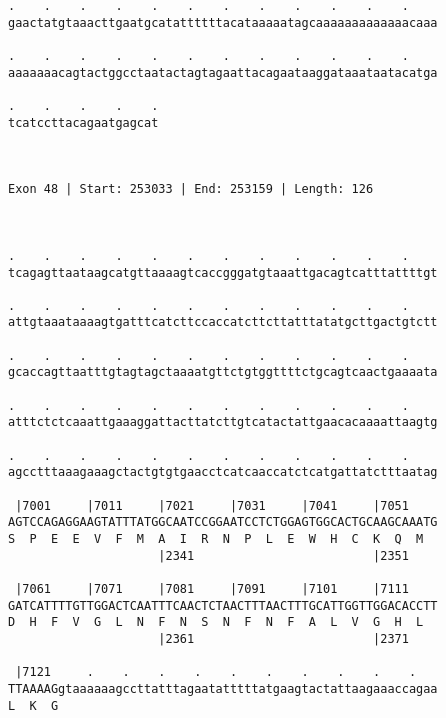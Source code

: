 \documentclass{article}
\begin{document}
\begin{Verbatim}
.    .    .    .    .    .    .    .    .    .    .    .    
gaactatgtaaacttgaatgcatattttttacataaaaatagcaaaaaaaaaaaaacaaa
                                                            
.    .    .    .    .    .    .    .    .    .    .    .    
aaaaaaacagtactggcctaatactagtagaattacagaataaggataaataatacatga
                                                            
.    .    .    .    .
tcatccttacagaatgagcat
                     
                     
 
Exon 48 | Start: 253033 | End: 253159 | Length: 126



.    .    .    .    .    .    .    .    .    .    .    .    
tcagagttaataagcatgttaaaagtcaccgggatgtaaattgacagtcatttattttgt
                                                            
.    .    .    .    .    .    .    .    .    .    .    .    
attgtaaataaaagtgatttcatcttccaccatcttcttatttatatgcttgactgtctt
                                                            
.    .    .    .    .    .    .    .    .    .    .    .    
gcaccagttaatttgtagtagctaaaatgttctgtggttttctgcagtcaactgaaaata
                                                            
.    .    .    .    .    .    .    .    .    .    .    .    
atttctctcaaattgaaaggattacttatcttgtcatactattgaacacaaaattaagtg
                                                            
.    .    .    .    .    .    .    .    .    .    .    .    
agcctttaaagaaagctactgtgtgaacctcatcaaccatctcatgattatctttaatag
                                                            
 |7001     |7011     |7021     |7031     |7041     |7051    
AGTCCAGAGGAAGTATTTATGGCAATCCGGAATCCTCTGGAGTGGCACTGCAAGCAAATG
S  P  E  E  V  F  M  A  I  R  N  P  L  E  W  H  C  K  Q  M  
                     |2341                         |2351    
  
 |7061     |7071     |7081     |7091     |7101     |7111    
GATCATTTTGTTGGACTCAATTTCAACTCTAACTTTAACTTTGCATTGGTTGGACACCTT
D  H  F  V  G  L  N  F  N  S  N  F  N  F  A  L  V  G  H  L  
                     |2361                         |2371    
  
 |7121     .    .    .    .    .    .    .    .    .    .   
TTAAAAGgtaaaaaagccttatttagaatatttttatgaagtactattaagaaaccagaa
L  K  G                                                     
                                                            

\end{Verbatim}
\end{document}
